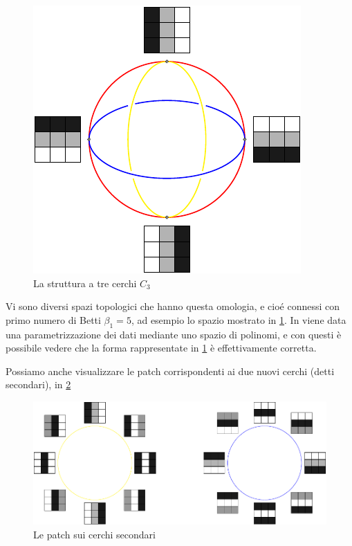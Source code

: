 
\begin{figure}[ht]
  \begin{center}
    \includegraphics[width=.4\linewidth]{gfx/patches_shape_labels.pdf}
    \caption{La struttura a tre cerchi $C_3$}
    \label{fig:patchshape}
  \end{center}
\end{figure}

Vi sono diversi spazi topologici che hanno questa omologia, e cioé connessi con primo numero di Betti $\beta_1=5$, ad esempio lo spazio mostrato in \cref{fig:patchshape}. In \cite{Carlsson2008} viene data una parametrizzazione dei dati mediante uno spazio di polinomi, e con questi è possibile vedere che la forma rappresentate in \cref{fig:patchshape} è effettivamente corretta.

Possiamo anche visualizzare le patch corrispondenti ai due nuovi cerchi (detti secondari), in \cref{fig:secondarycircle}

\begin{figure}[ht]
  \begin{center}
    \includegraphics[width=.8\linewidth]{gfx/secondarycircles.pdf}
    \caption{Le patch sui cerchi secondari}
    \label{fig:secondarycircle}
  \end{center}
\end{figure}

